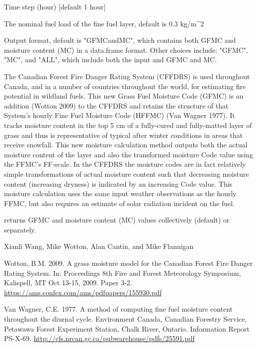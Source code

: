 \documentclass[a4paper]{book}
\begin{document}
\begin{Arguments}
\begin{ldescription}
\item[\code{time.step}] Time step (hour) [default 1 hour]

\item[\code{roFL}] The nominal fuel load of the fine fuel layer, default is 0.3
kg/m\textasciicircum{}2

\item[\code{out}] Output format, default is "GFMCandMC", which contains both GFMC
and moisture content (MC) in a data.frame format. Other choices include:
"GFMC", "MC", and "ALL", which include both the input and GFMC and MC.
\end{ldescription}
\end{Arguments}
%
\begin{Details}\relax
The Canadian Forest Fire Danger Rating System (CFFDRS) is used throughout
Canada, and in a number of countries throughout the world, for estimating
fire potential in wildland fuels. This new Grass Fuel Moisture Code (GFMC)
is an addition (Wotton 2009) to the CFFDRS and retains the structure of that
System's hourly Fine Fuel Moisture Code (HFFMC) (Van Wagner 1977). It tracks
moisture content in the top 5 cm of a fully-cured and fully-matted layer of
grass and thus is representative of typical after winter conditions in areas
that receive snowfall.  This new moisture calculation method outputs both
the actual moisture content of the layer and also the transformed moisture
Code value using the FFMC's FF-scale.  In the CFFDRS the moisture codes are
in fact relatively simple transformations of actual moisture content such
that decreasing moisture content (increasing dryness) is indicated by an
increasing Code value. This moisture calculation uses the same input weather
observations as the hourly FFMC, but also requires an estimate of solar
radiation incident on the fuel.
\end{Details}
%
\begin{Value}
 returns GFMC and moisture content (MC) values
collectively (default) or separately.
\end{Value}
%
\begin{Author}\relax
Xianli Wang, Mike Wotton, Alan Cantin, and Mike Flannigan
\end{Author}
%
\begin{References}\relax
Wotton, B.M. 2009. A grass moisture model for the Canadian
Forest Fire Danger Rating System. In: Proceedings 8th Fire and Forest
Meteorology Symposium, Kalispell, MT Oct 13-15, 2009. Paper 3-2.
\url{https://ams.confex.com/ams/pdfpapers/155930.pdf}

Van Wagner, C.E. 1977. A method of computing fine fuel moisture content
throughout the diurnal cycle. Environment Canada, Canadian Forestry Service,
Petawawa Forest Experiment Station, Chalk River, Ontario. Information Report
PS-X-69. \url{http://cfs.nrcan.gc.ca/pubwarehouse/pdfs/25591.pdf}
\end{References}
\end{document}
